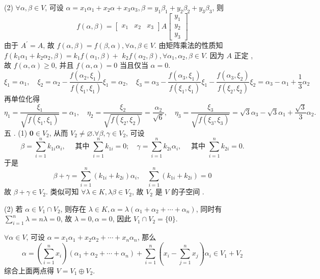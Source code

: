 \documentclass[10pt]{article}
\begin{document}
(2) $\forall \alpha, \beta \in V$,  可设  $\alpha=x_{1} \alpha_{1}+x_{2} \alpha+x_{3} \alpha_{3}, \beta=y_{1} \beta_{1}+y_{2} \beta_{2}+y_{3} \beta_{3}$,  则 
$$
f(\alpha, \beta)=\left[\begin{array}{lll}
x_{1} & x_{2} & x_{3}
\end{array}\right] A\left[\begin{array}{l}
y_{1} \\
y_{2} \\
y_{3}
\end{array}\right]
$$
 由于  $A^{\prime}=A$,  故  $f(\alpha, \beta)=f(\beta, \alpha), \forall \alpha, \beta \in V$.  由矩阵乘法的性质知  $f\left(k_{1} \alpha_{1}+k_{2} \alpha_{2}, \beta\right)=k_{1} f\left(\alpha_{1}, \beta\right)+$ $k_{2} f\left(\alpha_{2}, \beta\right), \forall \alpha_{1}, \alpha_{2}, \beta \in V$.  因为  $A$  正定 ,  故  $f(\alpha, \alpha) \geqslant 0$,  并且  $f(\alpha, \alpha)=0$  当且仅当  $\alpha=0$.
$$
\xi_{1}=\alpha_{1}, \quad \xi_{2}=\alpha_{2}-\frac{f\left(\alpha_{2}, \xi_{1}\right)}{f\left(\xi_{1}, \xi_{1}\right)} \xi_{1}=\alpha_{2}, \quad \xi_{3}=\alpha_{3}-\frac{f\left(\alpha_{3}, \xi_{1}\right)}{f\left(\xi_{1}, \xi_{1}\right)} \xi_{1}-\frac{f\left(\alpha_{3}, \xi_{2}\right)}{f\left(\xi_{2}, \xi_{2}\right)} \xi_{2}=\alpha_{3}-\alpha_{1}+\frac{1}{3} \alpha_{2}
$$
 再单位化得 
$$
\eta_{1}=\frac{\xi_{1}}{\sqrt{f\left(\xi_{1}, \xi_{1}\right)}}=\alpha_{1}, \quad \eta_{2}=\frac{\xi_{2}}{\sqrt{f\left(\xi_{2}, \xi_{2}\right)}}=\frac{\alpha_{2}}{\sqrt{6}}, \quad \eta_{3}=\frac{\xi_{3}}{\sqrt{f\left(\xi_{3}, \xi_{3}\right)}}=\sqrt{3} \alpha_{3}-\sqrt{3} \alpha_{1}+\frac{\sqrt{3}}{3} \alpha_{2} .
$$
 五 . (1) $\mathbf{0} \in V_{2}$,  从而  $V_{2} \neq \varnothing . \forall \beta, \gamma \in V_{2}$,  可设 
$$
\beta=\sum_{i=1}^{n} k_{1 i} \alpha_{i}, \quad \text { 其中 } \sum_{i=1}^{n} k_{1 i}=0 ; \quad \gamma=\sum_{i=1}^{n} k_{2 i} \alpha_{i}, \quad \text { 其中 } \sum_{i=1}^{n} k_{2 i}=0 .
$$
 于是 
$$
\beta+\gamma=\sum_{i=1}^{n}\left(k_{1 i}+k_{2 i}\right) \alpha_{i}, \quad \sum_{i=1}^{n}\left(k_{1 i}+k_{2 i}\right)=0
$$
 故  $\beta+\gamma \in V_{2}$.  类似可知  $\forall \lambda \in K, \lambda \beta \in V_{2}$,  故  $V_{2}$  是  $V$  的子空间 .

(2)  若  $\alpha \in V_{1} \cap V_{2}$,  则存在  $\lambda \in K, \alpha=\lambda\left(\alpha_{1}+\alpha_{2}+\cdots+\alpha_{n}\right)$,  同时有  $\sum_{i=1}^{n} \lambda=n \lambda=0$,  故  $\lambda=0, \alpha=0$,  因此  $V_{1} \cap V_{2}=\{0\}$.

$\forall \alpha \in V$,  可设  $\alpha=x_{1} \alpha_{1}+x_{2} \alpha_{2}+\cdots+x_{n} \alpha_{n}$,  那么 
$$
\alpha=\left(\sum_{i=1}^{n} x_{i}\right)\left(\alpha_{1}+\alpha_{2}+\cdots+\alpha_{n}\right)+\sum_{i=1}^{n}\left(x_{i}-\sum_{j=1}^{n} x_{j}\right) \alpha_{i} \in V_{1}+V_{2}
$$
 综合上面两点得  $V=V_{1} \oplus V_{2}$.
\end{document}
